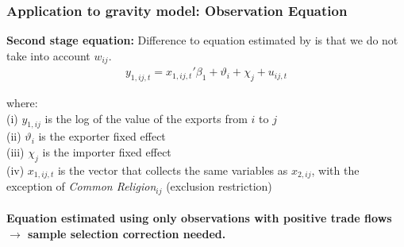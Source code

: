 \begin{frame}
    \frametitle{Application to gravity model: Observation Equation}  
    \textbf{Second stage equation:} Difference to equation estimated by \cite{helpman2008estimating} is that we do not take into account $w_{ij}$.
    \begin{align*}
        y_{1,ij,t} = x_{1,ij,t}'\beta_1 + \vartheta_i + \chi_j + u_{ij,t}
    \end{align*}
    
    \noindent where: \\
    (i) $y_{1,ij}$ is the log of the value of the exports from $i$ to $j$ \\
    (ii) $\vartheta_i$ is the exporter fixed effect \\ (iii) $\chi_j$ is the importer fixed effect \\
    (iv) $x_{1,ij,t}$ is the vector that collects the same variables as $x_{2,ij}$, with the exception of \textit{Common Religion}$_{ij}$ (exclusion restriction) \\~\\ 
    \textbf{Equation estimated using only observations with positive trade flows $\xrightarrow{}$ sample selection correction needed.}
\end{frame}

